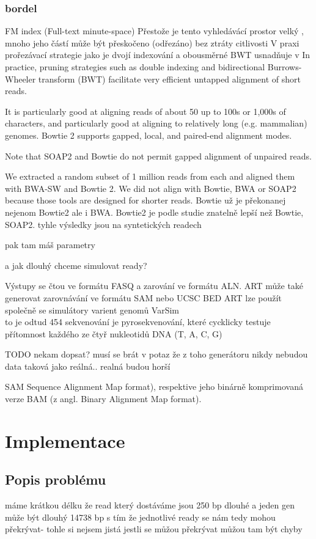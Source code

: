 \documentclass[czech,DP]{thesiskiv}
\numberwithin{equation}{section}
\begin{document}
\subsection{bordel}

FM index (Full-text minute-space) 
Přestože je tento vyhledávácí prostor velký , mnoho jeho částí může být přeskočeno (odřezáno) bez ztráty citlivosti
V praxi prořezávací strategie jako je dvojí indexování a obousměrné BWT usnadňuje v In practice, pruning strategies such as double indexing and bidirectional Burrows-Wheeler transform (BWT) facilitate very efficient untapped alignment of short reads.

 It is particularly good at aligning reads of about 50 up to 100s or 1,000s of characters, and particularly good at aligning to relatively long (e.g. mammalian) genomes.
  Bowtie 2 supports gapped, local, and paired-end alignment modes.

Note that SOAP2 and Bowtie do not permit gapped alignment of unpaired reads.

 We extracted a random subset of 1 million reads from each and aligned them with BWA-SW and Bowtie 2. We did not align with Bowtie, BWA or SOAP2 because those tools are designed for shorter reads.
Bowtie už je překonanej nejenom Bowtie2 ale i BWA.
Bowtie2 je podle studie znatelně lepší než Bowtie, SOAP2.
tyhle výsledky jsou na syntetických readech


pak tam máš parametry 

a jak dlouhý chceme simulovat ready? 

Výstupy se čtou ve formátu FASQ a zarování ve formátu ALN. 
ART může také generovat zarovnávání ve formátu SAM nebo UCSC BED
ART lze použít společně se simulátory varient genomů VarSim 
\\
to je odtud %
454 sekvenování je pyrosekvenování, které cycklicky testuje přítomnost každého ze čtyř nukleotidů DNA (T, A, C, G)


TODO nekam dopsat? musí se brát v potaz že z toho generátoru nikdy nebudou data taková jako reálná.. realná budou horší 


SAM Sequence Alignment Map format), respektive jeho binárně
komprimovaná verze BAM (z angl. Binary Alignment Map format).


\chapter{Implementace}
\section{Popis problému}
máme krátkou délku
že read který dostáváme jsou 250 bp dlouhé a jeden gen může být dlouhý 14738 bp
s tím že jednotlivé ready se nám tedy mohou překrývat- tohle si nejsem jistá jestli se můžou překrývat
můžou tam být chyby
\end{document}
